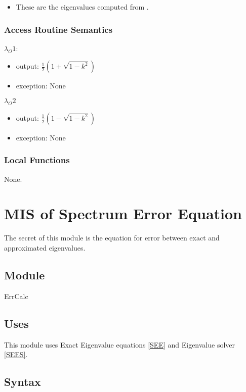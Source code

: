 \documentclass[12pt, titlepage]{article}
\begin{document}
\begin{itemize}
	\item These are the eigenvalues computed from \citet{SegaletAl}. 
\end{itemize}

\subsubsection{Access Routine Semantics}


$\lambda_O1$:
\begin{itemize}
	\item output: $\frac{1}{2} (1+\sqrt{1-k^{2}})$ 
	\item exception: None
\end{itemize}


\noindent $\lambda_O2$
\begin{itemize} 
	\item output: $\frac{1}{2} (1-\sqrt{1-k^{2}})$ 
	\item exception: None
\end{itemize}

\subsubsection{Local Functions} 

None. 

\newpage

\section{MIS of Spectrum Error Equation} \label{MSEE}

The secret of this module is the equation for error between exact and 
approximated eigenvalues.

\subsection{Module}

ErrCalc

\subsection{Uses}

This module uses Exact Eigenvalue equations \ref{SEE} and Eigenvalue solver 
\ref{SEES}. 

\subsection{Syntax}
\end{document}
